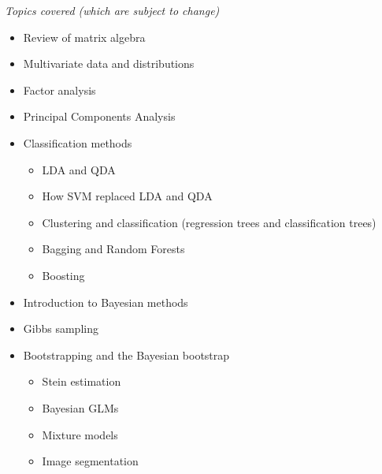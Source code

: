 \documentclass[11pt]{article}
\begin{document}

\emph{Topics covered (which are subject to change)}
\begin{itemize}
\item Review of matrix algebra
\item Multivariate data and distributions 
\item Factor analysis 
\item Principal Components Analysis 
\item Classification methods 
\begin{itemize}
\item LDA and QDA 
\item How SVM replaced LDA and QDA
\item Clustering and classification (regression trees and classification trees)
\item Bagging and Random Forests 
\item Boosting
\end{itemize}
\item Introduction to Bayesian methods
\item Gibbs sampling
\item Bootstrapping and the Bayesian bootstrap
\begin{itemize}
\item Stein estimation
\item Bayesian GLMs
\item Mixture models
\item Image segmentation
\end{itemize}
\end{itemize}
\vspace{0.4cm}
\end{document}
